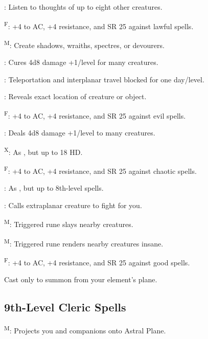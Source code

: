 : Listen to thoughts of up to eight other creatures.

\textsuperscript{F}: +4 to AC, +4 resistance, and SR 25 against lawful spells.

\textsuperscript{M}: Create shadows, wraiths, spectres, or devourers.

: Cures 4d8 damage +1/level for many creatures.

: Teleportation and interplanar travel blocked for one day/level.

: Reveals exact location of creature or object.



\textsuperscript{F}: +4 to AC, +4 resistance, and SR 25 against evil spells.

: Deals 4d8 damage +1/level to many creatures.

\textsuperscript{X}: As , but up to 18 HD.

\textsuperscript{F}: +4 to AC, +4 resistance, and SR 25 against chaotic spells.

: As , but up to 8th-level spells.

\footnotemark[1]: Calls extraplanar creature to fight for you.

\textsuperscript{M}: Triggered rune slays nearby creatures.

\textsuperscript{M}: Triggered rune renders nearby creatures insane.

\textsuperscript{F}: +4 to AC, +4 resistance, and SR 25 against good spells.

 Cast only to summon from your element's plane.



\subsection{9th-Level Cleric Spells}

\textsuperscript{M}: Projects you and companions onto Astral Plane.

